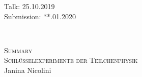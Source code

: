 



\begin{titlepage}
  \begin{flushleft}
 	Talk: 25.10.2019\\
	Submission: **.01.2020
  \end{flushleft}


\HRule\\[1,0cm]

 \begin{center}


\textsc{\LARGE Summary }\\[1.5cm]
\textsc{\huge Schlüsselexperimente der Teilchenphysik} \\[5,5cm]

Janina Nicolini\footnotemark[1] \\



 \end{center}
\HRule

 \vfill

\end{titlepage}


%
\tableofcontents
\newpage

\newpage

\newpage

\newpage

\newpage

\newpage

\newpage

\newpage

\newpage

\newpage

\newpage

\newpage

\newpage

\newpage
% 
\printbibliography[heading=bibintoc]


